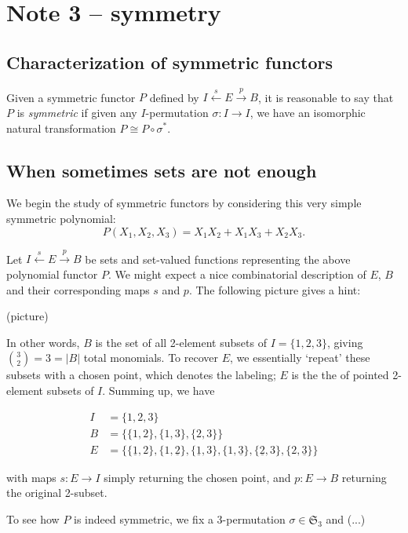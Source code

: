 
\pagebreak

\section{Note 3 -- symmetry}

\subsection{Characterization of symmetric functors}

Given a symmetric functor $P$ defined by $I \overset{s}{\gets} E \overset{p}{\to} B$, it is reasonable to say that $P$ is \emph{symmetric} if given any $I$-permutation $\sigma:I\to I$, we have an isomorphic natural transformation $P \cong P\circ \sigma^*$.

\subsection{When sometimes sets are not enough}

We begin the study of symmetric functors by considering this very simple symmetric polynomial:
\[
P(X_1,X_2,X_3) = X_1X_2 + X_1X_3 + X_2X_3.
\]

Let $I \overset{s}{\gets} E \overset{p}{\to} B$ be sets and set-valued functions representing the above polynomial functor $P$. We might expect a nice combinatorial description of $E$, $B$ and their corresponding maps $s$ and $p$. The following picture gives a hint:

(picture)

In other words, $B$ is the set of all 2-element subsets of $I=\{1,2,3\}$, giving $\binom{3}{2}=3=|B|$ total monomials. To recover $E$, we essentially `repeat' these subsets with a chosen point, which denotes the labeling; $E$ is the the of pointed 2-element subsets of $I$. Summing up, we have

\begin{align*}
I &= \{1,2,3\}\\
B &= \{\{1,2\},\{1,3\},\{2,3\}\}\\
E &= \{\{\underline{1},2\}, \{1,\underline{2}\}, \{\underline{1},3\}, \{1,\underline{3}\},\{\underline{2},3\}, \{2,\underline{3}\}\}
\end{align*}

with maps $s:E\to I$ simply returning the chosen point, and $p:E\to B$ returning the original 2-subset.

To see how $P$ is indeed symmetric, we fix a 3-permutation $\sigma\in\mathfrak{S}_3$ and (...)

